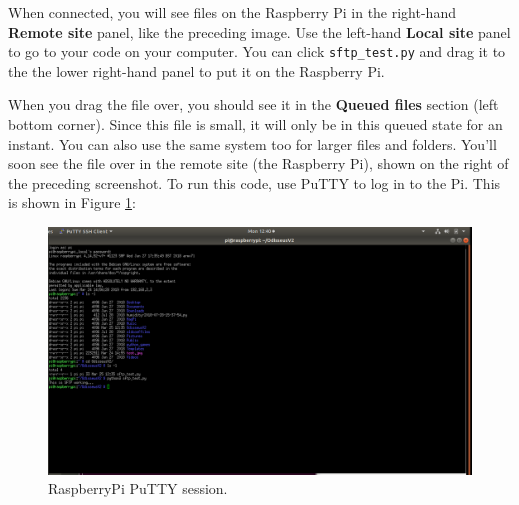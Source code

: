 When connected, you will see files on the Raspberry Pi in the right-hand \textbf{Remote site} panel,
like the preceding image. Use the left-hand \textbf{Local site} panel to go to your code on your
computer. You can click \lstinline{sftp_test.py} and drag it to the the lower right-hand panel to put it on the Raspberry Pi.


When you drag the file over, you should see it in the \textbf{Queued files} section (left bottom corner). Since this file is
small, it will only be in this queued state for an instant. You can also use the same system
too for larger files and folders. You'll soon see the file over in the remote site (the Raspberry Pi), shown on the right of the preceding screenshot. 
To run this code, use PuTTY to log in to the Pi. This is shown in Figure \ref{raspberrypi_putty_session}:




\begin{figure}[!htb]
\begin{center}
\includegraphics[scale=0.280]{img/raspberrypi/putty.png}
\end{center}
\caption{RaspberryPi PuTTY session.}
\label{raspberrypi_putty_session}
\end{figure}


